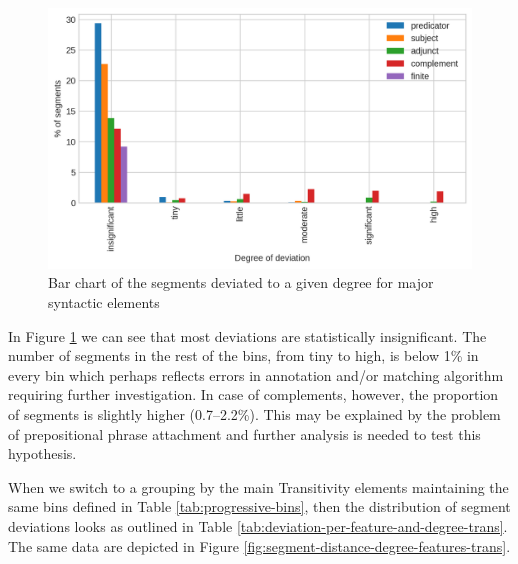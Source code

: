    \begin{figure}[!ht]
        \centering
        \includegraphics[width=.65\textwidth]{evaluation-results/figures/distance-degree-features-syntactic}
        \caption{Bar chart of the segments deviated to a given degree for major syntactic elements}
        \label{fig:segment-distance-degree-features-mood}
    \end{figure}

    In Figure \ref{fig:segment-distance-degree-features-mood} we can see that most deviations are statistically insignificant. The number of segments in the rest of the bins, from tiny to high, is below 1\% in every bin which perhaps reflects errors in annotation and/or matching algorithm requiring further investigation. In case of complements, however, the proportion of segments is slightly higher (0.7--2.2\%). This may be explained by the problem of prepositional phrase attachment and further analysis is needed to test this hypothesis. 

    When we switch to a grouping by the main Transitivity elements maintaining the same bins defined in Table \ref{tab:progressive-bins}, then the distribution of segment deviations looks as outlined in Table \ref{tab:deviation-per-feature-and-degree-trans}. The same data are depicted in Figure \ref{fig:segment-distance-degree-features-trans}. 

